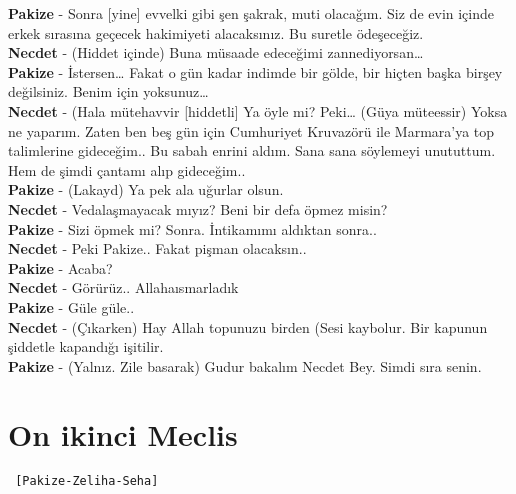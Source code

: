 \documentclass[]{book}
\begin{document}
\textbf{Pakize} - Sonra {[}yine{]} evvelki gibi şen şakrak, muti olacağım. Siz de evin içinde erkek sırasına geçecek hakimiyeti alacaksınız. Bu suretle ödeşeceğiz.\\
\textbf{Necdet} - (Hiddet içinde) Buna müsaade edeceğimi zannediyorsan\ldots{}\\
\textbf{Pakize} - İstersen\ldots{} Fakat o gün kadar indimde bir gölde, bir hiçten başka birşey değilsiniz. Benim için yoksunuz\ldots{}\\
\textbf{Necdet} - (Hala mütehavvir {[}hiddetli{]} Ya öyle mi? Peki\ldots{} (Güya müteessir) Yoksa ne yaparım. Zaten ben beş gün için Cumhuriyet Kruvazörü ile Marmara'ya top talimlerine gideceğim.. Bu sabah enrini aldım. Sana sana söylemeyi unututtum. Hem de şimdi çantamı alıp gideceğim..\\
\textbf{Pakize} - (Lakayd) Ya pek ala uğurlar olsun.\\
\textbf{Necdet} - Vedalaşmayacak mıyız? Beni bir defa öpmez misin?\\
\textbf{Pakize} - Sizi öpmek mi? Sonra. İntikamımı aldıktan sonra..\\
\textbf{Necdet} - Peki Pakize.. Fakat pişman olacaksın..\\
\textbf{Pakize} - Acaba?\\
\textbf{Necdet} - Görürüz.. Allahaısmarladık\\
\textbf{Pakize} - Güle güle..\\
\textbf{Necdet} - (Çıkarken) Hay Allah topunuzu birden (Sesi kaybolur. Bir kapunun şiddetle kapandığı işitilir.\\
\textbf{Pakize} - (Yalnız. Zile basarak) Gudur bakalım Necdet Bey. Simdi sıra senin.\\

\hypertarget{on-ikinci-meclis}{%
\section{On ikinci Meclis}\label{on-ikinci-meclis}}

\begin{verbatim}
 [Pakize-Zeliha-Seha]
\end{verbatim}
\end{document}

